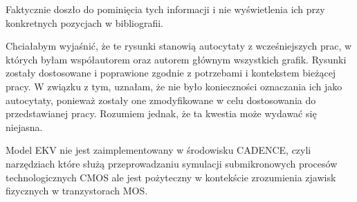\begin{frame}[t]
    \begin{block}{\tb}
    \end{block}

Faktycznie doszło do pominięcia tych informacji i nie wyświetlenia ich przy konkretnych pozycjach w bibliografii.

    \begin{block}{\tb}
    \end{block}


    Chciałabym wyjaśnić, że te rysunki stanowią autocytaty z wcześniejszych prac, w których byłam współautorem oraz autorem głównym wszystkich grafik. Rysunki zostały dostosowane i poprawione zgodnie z potrzebami i kontekstem bieżącej pracy. W związku z tym, uznałam, że nie było konieczności oznaczania ich jako autocytaty, ponieważ zostały one zmodyfikowane w celu dostosowania do przedstawianej pracy. Rozumiem jednak, że ta kwestia może wydawać się niejasna.


\end{frame}

\begin{frame}[t]
    \begin{block}{\tb}
    \end{block}


    Model EKV nie jest zaimplementowany w środowisku CADENCE, czyli narzędziach które służą przeprowadzaniu symulacji submikronowych procesów technologicznych CMOS ale jest pożyteczny w kontekście zrozumienia zjawisk fizycznych w tranzystorach MOS. 
\end{frame}
  
